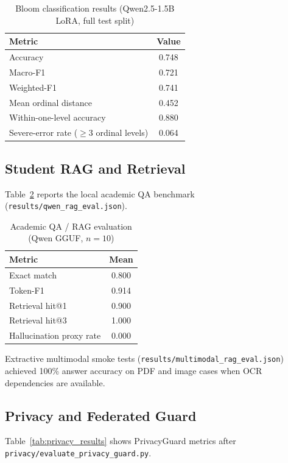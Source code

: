 \begin{table}[H]
\centering
\caption{Bloom classification results (Qwen2.5-1.5B LoRA, full test split)}
\label{tab:bloom_results}
\renewcommand{\arraystretch}{1.2}
\begin{tabular}{|l|c|}
\hline
\textbf{Metric} & \textbf{Value} \\
\hline
Accuracy & 0.748 \\
\hline
Macro-F1 & 0.721 \\
\hline
Weighted-F1 & 0.741 \\
\hline
Mean ordinal distance & 0.452 \\
\hline
Within-one-level accuracy & 0.880 \\
\hline
Severe-error rate ($\geq$3 ordinal levels) & 0.064 \\
\hline
\end{tabular}
\end{table}

\subsection{Student RAG and Retrieval}
Table~\ref{tab:rag_results} reports the local academic QA benchmark (\texttt{results/qwen\_rag\_eval.json}).

\begin{table}[H]
\centering
\caption{Academic QA / RAG evaluation (Qwen GGUF, $n{=}10$)}
\label{tab:rag_results}
\renewcommand{\arraystretch}{1.2}
\begin{tabular}{|l|c|}
\hline
\textbf{Metric} & \textbf{Mean} \\
\hline
Exact match & 0.800 \\
\hline
Token-F1 & 0.914 \\
\hline
Retrieval hit@1 & 0.900 \\
\hline
Retrieval hit@3 & 1.000 \\
\hline
Hallucination proxy rate & 0.000 \\
\hline
\end{tabular}
\end{table}

Extractive multimodal smoke tests (\texttt{results/multimodal\_rag\_eval.json}) achieved 100\% answer accuracy on PDF and image cases when OCR dependencies are available.

\subsection{Privacy and Federated Guard}
Table~\ref{tab:privacy_results} shows PrivacyGuard metrics after \texttt{privacy/evaluate\_privacy\_guard.py}.

